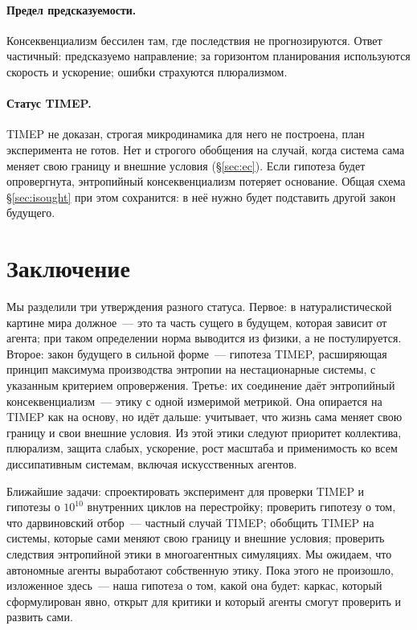 \documentclass[11pt,a4paper]{article}
\newcommand{\Sref}[1]{\hyperref[#1]{\S\ref{#1}}}
\begin{document}
\paragraph{Предел предсказуемости.}
Консеквенциализм бессилен там, где последствия не прогнозируются. Ответ частичный: предсказуемо направление; за горизонтом планирования используются скорость и ускорение; ошибки страхуются плюрализмом.

\paragraph{Статус TIMEP.}
TIMEP не доказан, строгая микродинамика для него не построена, план эксперимента не готов. Нет и строгого обобщения на случай, когда система сама меняет свою границу и внешние условия (\Sref{sec:ec}). Если гипотеза будет опровергнута, энтропийный консеквенциализм потеряет основание. Общая схема \Sref{sec:isought} при этом сохранится: в неё нужно будет подставить другой закон будущего.

\section{Заключение}\label{sec:conclusion}

Мы разделили три утверждения разного статуса. Первое: в натуралистической картине мира должное~--- это та часть сущего в будущем, которая зависит от агента; при таком определении норма выводится из физики, а не постулируется. Второе: закон будущего в сильной форме~--- гипотеза TIMEP, расширяющая принцип максимума производства энтропии на нестационарные системы, с указанным критерием опровержения. Третье: их соединение даёт энтропийный консеквенциализм~--- этику с одной измеримой метрикой. Она опирается на TIMEP как на основу, но идёт дальше: учитывает, что жизнь сама меняет свою границу и свои внешние условия. Из этой этики следуют приоритет коллектива, плюрализм, защита слабых, ускорение, рост масштаба и применимость ко всем диссипативным системам, включая искусственных агентов.

Ближайшие задачи: спроектировать эксперимент для проверки TIMEP и гипотезы о $10^{10}$ внутренних циклов на перестройку; проверить гипотезу о том, что дарвиновский отбор~--- частный случай TIMEP; обобщить TIMEP на системы, которые сами меняют свою границу и внешние условия; проверить следствия энтропийной этики в многоагентных симуляциях. Мы ожидаем, что автономные агенты выработают собственную этику. Пока этого не произошло, изложенное здесь~--- наша гипотеза о том, какой она будет: каркас, который сформулирован явно, открыт для критики и который агенты смогут проверить и развить сами.
\end{document}
